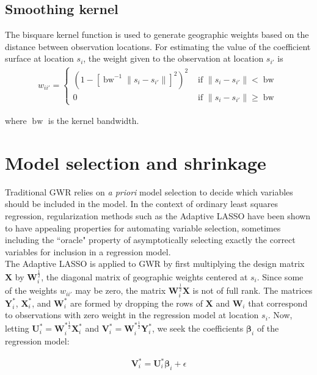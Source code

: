 \documentclass[authoryear, review, 11pt]{elsarticle}
\DeclareMathOperator*{\bw}{\mbox{bw}}
\begin{document}
	 
	 \subsection{Smoothing kernel}
	 	The bisquare kernel function is used to generate geographic weights based on the distance between observation locations. For estimating the value of the coefficient surface at location $s_i$, the weight given to the observation at location $s_{i'}$ is	
	\begin{eqnarray}
		w_{ii'} = \begin{cases} \left( 1-\left[ \bw^{-1} \|s_i-s_{i'}\| \right]^2 \right)^2 & \mbox{ if } \|s_i-s_{i'}\| < \bw \\ 0 & \mbox{ if } \|s_i-s_{i'}\| \geq \bw \end{cases}
	\end{eqnarray}
	
	where $\bw$ is the kernel bandwidth.\\
	
\section{Model selection and shrinkage \label{section:method}}
	Traditional GWR relies on \emph{a priori} model selection to decide which variables should be included in the model. In the context of ordinary least squares regression, regularization methods such as the Adaptive LASSO \citep{Zou:2006} have been shown to have appealing properties for automating variable selection, sometimes including the ``oracle" property of asymptotically selecting exactly the correct variables for inclusion in a regression model.\\
	
	The Adaptive LASSO is applied to GWR by first multiplying the design matrix $\bm{X}$ by $\bm{W}_i^{\frac{1}{2}}$, the diagonal matrix of geographic weights centered at $s_i$. Since some of the weights $w_{ii'}$ may be zero, the matrix $\bm{W}_i^{\frac{1}{2}}\bm{X}$ is not of full rank. The matrices $\bm{Y}_i^*$, $\bm{X}_i^*$, and $\bm{W}_i^*$ are formed by dropping the rows of $\bm{X}$  and $\bm{W}_i$ that correspond to observations with zero weight in the regression model at location $s_i$. Now, letting $\bm{U}_i^* = \bm{W}_i^{*\frac{1}{2}} \bm{X}_i^*$ and $\bm{V}_i^* = \bm{W}_i^{*\frac{1}{2}} \bm{Y}_i^*$, we seek the coefficients $\bm{\beta}_i$ of the regression model:
	
	\begin{eqnarray}
		\bm{V}_i^* = \bm{U}_i^* \bm{\beta}_i + \epsilon
	\end{eqnarray}
	
\end{document}
